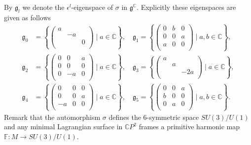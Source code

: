 \documentclass[a4paper,11pt]{amsart}
\theoremstyle{definition}
\numberwithin{equation}{section}
\newcommand{\C}{\mathbb{C}}
\begin{document}
By $\mathfrak{g}_l$ we denote the $\epsilon^l$-eigenspace of $\sigma$ in  $\mathfrak{g}^{\mathbb C}$. 
Explicitly these eigenspaces are given as follows
\begin{equation*}
\begin{split}
\mathfrak{g}_0&=\left\{
                    \begin{pmatrix}
                    a &  &  \\
                     & -a &  \\
                     &  & 0 \\
                \end{pmatrix}
                \mid a\in \C
\right\},
\quad
\mathfrak{g}_1=\left\{\begin{pmatrix}
                    0 & b & 0 \\
                     0 & 0 & a \\
                     a & 0 & 0 \\
                  \end{pmatrix}\mid a,b\in\C
\right\},
\\
\mathfrak{g}_2&=\left\{
                  \begin{pmatrix}
                    0 & 0& a  \\
                     0& 0 & 0 \\
                     0& -a & 0 \\
                  \end{pmatrix} \mid a\in \C
              \right\},
\quad
\mathfrak{g}_3=\left\{
                  \begin{pmatrix}
                    a &  &  \\
                      & a &  \\
                      &  & -2a \\
                  \end{pmatrix} \mid a\in \C
              \right\},\\
\mathfrak{g}_4&=\left\{
                  \begin{pmatrix}
                    0 & 0 & 0  \\
                     0& 0 & a \\
                     -a & 0 & 0 \\
                  \end{pmatrix} \mid a\in \C
            \right\},
\quad
\mathfrak{g}_5=\left\{
                  \begin{pmatrix}
                    0 & 0 & a \\
                     b & 0 & 0 \\
                     0 & a & 0 \\
                  \end{pmatrix} \mid a, b\in \C 
                \right\}.
\end{split}
\end{equation*}
Remark that the automorphism $\sigma$ defines the $6$-symmetric space 
$SU(3)/U(1)$
and any minimal Lagrangian surface in $\mathbb{C}P^2$ frames a primitive harmonic map $\mathbb{F}: M\rightarrow SU(3)/U(1)$.
\end{document}

